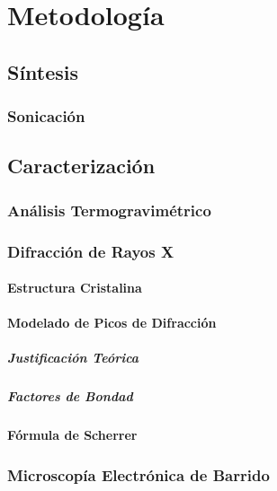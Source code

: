 \documentclass[../main.tex]{subfiles}
\begin{document}
\chapter{Metodología}

\section{Síntesis}

\subsection{Sonicación}

\section{Caracterización}

\subsection{Análisis Termogravimétrico}

\subsection{Difracción de Rayos X}

\subsubsection{Estructura Cristalina}

\subsubsection{Modelado de Picos de Difracción}

\paragraph{Justificación Teórica}

\paragraph{Factores de Bondad}

\subsubsection{Fórmula de Scherrer}

\subsection{Microscopía Electrónica de Barrido}
\end{document}
